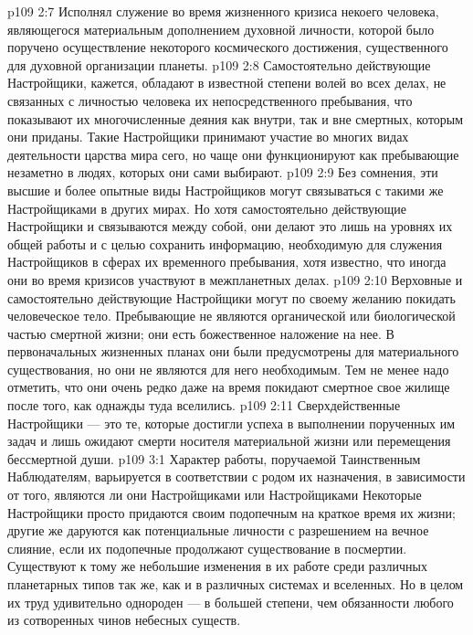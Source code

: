 \vs p109 2:7 \bibnobreakspace Исполнял служение во время жизненного кризиса некоего человека, являющегося материальным дополнением духовной личности, которой было поручено осуществление некоторого космического достижения, существенного для духовной организации планеты.
\vs p109 2:8 \pc Самостоятельно действующие Настройщики, кажется, обладают в известной степени волей во всех делах, не связанных с личностью человека их непосредственного пребывания, что показывают их многочисленные деяния как внутри, так и вне смертных, которым они приданы. Такие Настройщики принимают участие во многих видах деятельности царства мира сего, но чаще они функционируют как пребывающие незаметно в людях, которых они сами выбирают.
\vs p109 2:9 Без сомнения, эти высшие и более опытные виды Настройщиков могут связываться с такими же Настройщиками в других мирах. Но хотя самостоятельно действующие Настройщики и связываются между собой, они делают это лишь на уровнях их общей работы и с целью сохранить информацию, необходимую для служения Настройщиков в сферах их временного пребывания, хотя известно, что иногда они во время кризисов участвуют в межпланетных делах.
\vs p109 2:10 Верховные и самостоятельно действующие Настройщики могут по своему желанию покидать человеческое тело. Пребывающие не являются органической или биологической частью смертной жизни; они есть божественное наложение на нее. В первоначальных жизненных планах они были предусмотрены для материального существования, но они не являются для него необходимым. Тем не менее надо отметить, что они очень редко даже на время покидают смертное свое жилище после того, как однажды туда вселились.
\vs p109 2:11 Сверхдейственные Настройщики --- это те, которые достигли успеха в выполнении порученных им задач и лишь ожидают смерти носителя материальной жизни или перемещения бессмертной души.
\vs p109 3:1 Характер работы, поручаемой Таинственным Наблюдателям, варьируется в соответствии с родом их назначения, в зависимости от того, являются ли они Настройщиками  или Настройщиками  Некоторые Настройщики просто придаются своим подопечным на краткое время их жизни; другие же даруются как потенциальные личности с разрешением на вечное слияние, если их подопечные продолжают существование в посмертии. Существуют к тому же небольшие изменения в их работе среди различных планетарных типов так же, как и в различных системах и вселенных. Но в целом их труд удивительно однороден --- в большей степени, чем обязанности любого из сотворенных чинов небесных существ.
